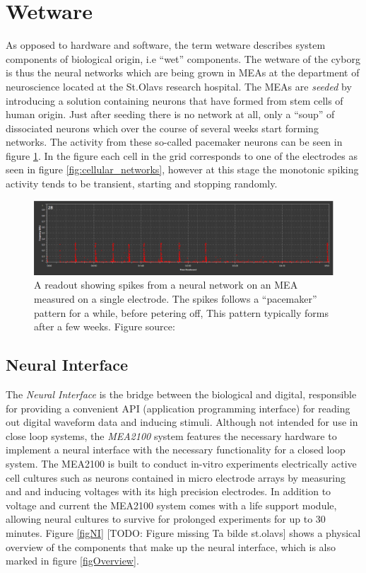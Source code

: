 \section{Wetware}
As opposed to hardware and software, the term wetware describes system
components of biological origin, i.e ``wet'' components.
The wetware of the cyborg is thus the neural networks which are being grown in
MEAs at the department of neuroscience located at the St.Olavs research hospital.
The MEAs are \emph{seeded} by introducing a solution containing neurons that
have formed from stem cells of human origin\cite{TMAC}.
Just after seeding there is no network at all, only a ``soup'' of dissociated
neurons which over the course of several weeks start forming networks.
The activity from these so-called pacemaker neurons can be seen in figure
\ref{pacemaker}.
In the figure each cell in the grid corresponds to one of the
electrodes as seen in figure \ref{fig:cellular_networks}, however at this stage the
monotonic spiking activity tends to be transient, starting and stopping
randomly.
\begin{figure}[h]
  \centering
  \includegraphics[width=1\textwidth]{fig/tonic.png}
  \caption{
    A readout showing spikes from a neural network on an MEA measured on a
    single electrode.
    The spikes follows a ``pacemaker'' pattern for a while, before petering off,
    This pattern typically forms after a few weeks.
    Figure source: \cite{TMAC}
  }
  \label{pacemaker}
\end{figure}
\subsection{Neural Interface}
The \emph{Neural Interface} is the bridge between the biological and digital,
responsible for providing a convenient API (application programming interface)
for reading out digital waveform data and inducing stimuli.
Although not intended for use in close loop systems, the \textit{MEA2100}
system features the necessary hardware to implement a neural interface with the
necessary functionality for a closed loop system.
The MEA2100 is built to conduct in-vitro experiments electrically active cell
cultures such as neurons contained in micro electrode arrays by measuring and
and inducing voltages with its high precision electrodes.
In addition to voltage and current the MEA2100 system comes with a life support
module, allowing neural cultures to survive for prolonged experiments for up to
30 minutes.
Figure \ref{figNI} [TODO: Figure missing Ta bilde st.olavs] shows a physical overview of the components that make up the
neural interface, which is also marked in figure \ref{figOverview}.
